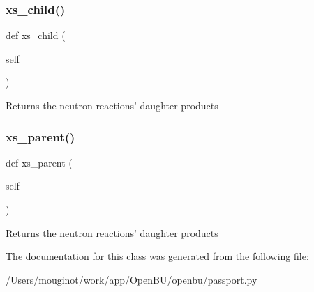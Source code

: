 \subsubsection{\texorpdfstring{xs\+\_\+child()}{xs\_child()}}
{\footnotesize\ttfamily def xs\+\_\+child (\begin{DoxyParamCaption}\item[{}]{self }\end{DoxyParamCaption})}

\begin{DoxyVerb}Returns the neutron reactions' daughter products\end{DoxyVerb}
 \mbox{\label{classopenbu_1_1passport_1_1_passport_a0f25e060e526ebc2db82f4769504a0b4}} 
\subsubsection{\texorpdfstring{xs\+\_\+parent()}{xs\_parent()}}
{\footnotesize\ttfamily def xs\+\_\+parent (\begin{DoxyParamCaption}\item[{}]{self }\end{DoxyParamCaption})}

\begin{DoxyVerb}Returns the neutron reactions' daughter products\end{DoxyVerb}
 

The documentation for this class was generated from the following file\+:\begin{DoxyCompactItemize}
\item 
/\+Users/mouginot/work/app/\+Open\+B\+U/openbu/passport.\+py\end{DoxyCompactItemize}

